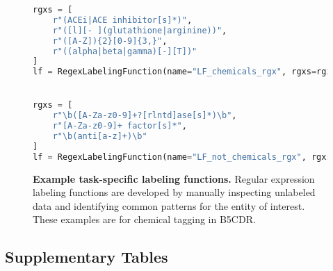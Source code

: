 \documentclass{article}
\begin{document}
\begin{figure}[H]
\centering
\begin{lstlisting}[language=Python]
rgxs = [
    r"(ACEi|ACE inhibitor[s]*)",
    r"([l][- ](glutathione|arginine))",
    r"([A-Z]){2}[0-9]{3,}",
    r"((alpha|beta|gamma)[-][T])"
]
lf = RegexLabelingFunction(name="LF_chemicals_rgx", rgxs=rgxs, label=1))


rgxs = [
    r"\b([A-Za-z0-9]+?[rlntd]ase[s]*)\b",
    r"[A-Za-z0-9]+ factor[s]*",
    r"\b(anti[a-z]+)\b"
]
lf = RegexLabelingFunction(name="LF_not_chemicals_rgx", rgxs=rgxs, label=0))
\end{lstlisting}
\caption{\textbf{Example task-specific labeling functions.}
Regular expression labeling functions are developed by manually inspecting unlabeled data and identifying common patterns for the entity of interest.
These examples are for chemical tagging in B5CDR.}
\end{figure}


\subsection*{Supplementary Tables}
\end{document}
